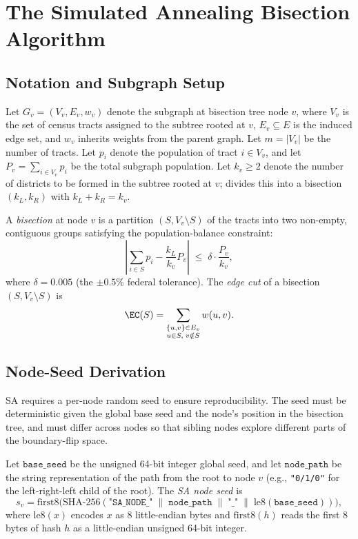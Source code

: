 \section{The Simulated Annealing Bisection Algorithm}
\label{sec:algorithm}

\subsection{Notation and Subgraph Setup}

Let $G_v = (V_v, E_v, w_v)$ denote the subgraph at bisection tree node $v$,
where $V_v$ is the set of census tracts assigned to the subtree rooted at $v$,
$E_v \subseteq E$ is the induced edge set, and $w_v$ inherits weights from the
parent graph.
Let $m = |V_v|$ be the number of tracts.
Let $p_i$ denote the population of tract $i \in V_v$, and let
$P_v = \sum_{i \in V_v} p_i$ be the total subgraph population.
Let $k_v \ge 2$ denote the number of districts to be formed in the subtree
rooted at $v$; \sa{} divides this into a bisection $(k_L, k_R)$ with
$k_L + k_R = k_v$.

A \emph{bisection} at node $v$ is a partition $(S, V_v \setminus S)$ of the
tracts into two non-empty, contiguous groups satisfying the population-balance
constraint:
\[
  \left|\sum_{i \in S} p_i - \frac{k_L}{k_v} P_v \right|
  \;\le\;
  \delta \cdot \frac{P_v}{k_v},
\]
where $\delta = 0.005$ (the $\pm 0.5\%$ federal tolerance).
The \emph{edge cut} of a bisection $(S, V_v \setminus S)$ is
\[
  \EC(S) = \sum_{\substack{\{u,v\} \in E_v \\ u \in S,\; v \notin S}} w(u,v).
\]

\subsection{Node-Seed Derivation}

SA requires a per-node random seed to ensure reproducibility.
The seed must be deterministic given the global base seed and the node's
position in the bisection tree, and must differ across nodes so that
sibling nodes explore different parts of the boundary-flip space.

\begin{definition}
\label{def:sa-seed}
Let $\mathtt{base\_seed}$ be the unsigned 64-bit integer global seed, and let
$\mathtt{node\_path}$ be the string representation of the path from the root
to node $v$ (e.g., \texttt{"0/1/0"} for the left-right-left child of the root).
The \emph{SA node seed} is
\[
  s_v = \mathrm{first8}\bigl(
    \mathrm{SHA\text{-}256}(
      \texttt{"SA\_NODE\_"} \;\|\; \mathtt{node\_path}
      \;\|\; \texttt{"\_"} \;\|\; \mathrm{le8}(\mathtt{base\_seed})
    )
  \bigr),
\]
where $\mathrm{le8}(x)$ encodes $x$ as 8 little-endian bytes and
$\mathrm{first8}(h)$ reads the first 8 bytes of hash $h$ as a little-endian
unsigned 64-bit integer.
\end{definition}

